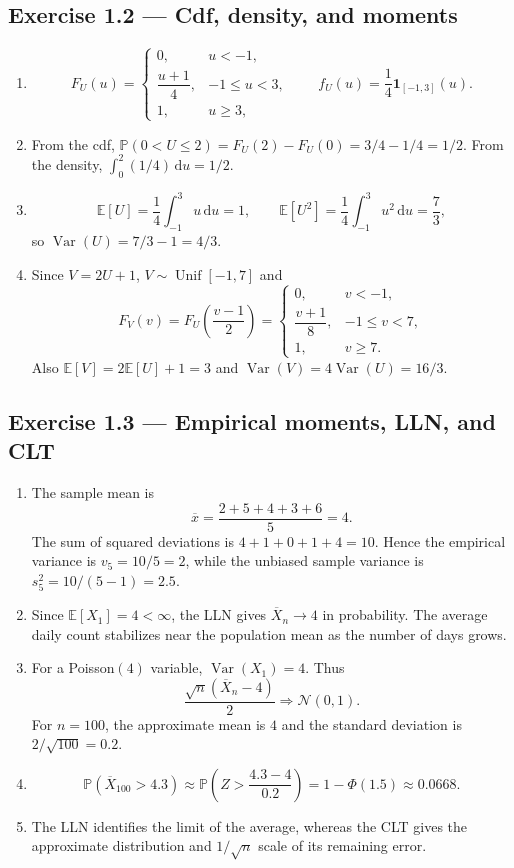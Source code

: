 \documentclass[11pt]{article}
\newcommand{\Pb}{\mathbb{P}}
\newcommand{\E}{\mathbb{E}}
\newcommand{\1}{\mathbf{1}}
\newcommand{\dd}{\,\mathrm{d}}
\begin{document}
\subsection*{Exercise 1.2 --- Cdf, density, and moments}
\begin{enumerate}
  \item
  \[
  F_U(u)=
  \begin{cases}
  0,&u<-1,\\
  \dfrac{u+1}{4},&-1\le u<3,\\
  1,&u\ge3,
  \end{cases}
  \qquad
  f_U(u)=\frac14\1_{[-1,3]}(u).
  \]
  \item From the cdf,
  $\Pb(0<U\le2)=F_U(2)-F_U(0)=3/4-1/4=1/2$.
  From the density, $\int_0^2(1/4)\dd u=1/2$.
  \item
  \[
  \E[U]=\frac14\int_{-1}^3u\dd u=1,
  \qquad
  \E[U^2]=\frac14\int_{-1}^3u^2\dd u=\frac73,
  \]
  so $\operatorname{Var}(U)=7/3-1=4/3$.
  \item Since $V=2U+1$, $V\sim\operatorname{Unif}[-1,7]$ and
  \[
  F_V(v)=F_U\!\left(\frac{v-1}{2}\right)
  =\begin{cases}
  0,&v<-1,\\
  \dfrac{v+1}{8},&-1\le v<7,\\
  1,&v\ge7.
  \end{cases}
  \]
  Also $\E[V]=2\E[U]+1=3$ and
  $\operatorname{Var}(V)=4\operatorname{Var}(U)=16/3$.
\end{enumerate}

\subsection*{Exercise 1.3 --- Empirical moments, LLN, and CLT}
\begin{enumerate}
  \item The sample mean is
  \[
  \overline x=\frac{2+5+4+3+6}{5}=4.
  \]
  The sum of squared deviations is $4+1+0+1+4=10$. Hence the empirical
  variance is $v_5=10/5=2$, while the unbiased sample variance is
  $s_5^2=10/(5-1)=2.5$.
  \item Since $\E[X_1]=4<\infty$, the LLN gives
  $\overline X_n\to4$ in probability. The average daily count stabilizes near
  the population mean as the number of days grows.
  \item For a Poisson$(4)$ variable, $\operatorname{Var}(X_1)=4$. Thus
  \[
  \frac{\sqrt n(\overline X_n-4)}{2}
  \Rightarrow\mathcal N(0,1).
  \]
  For $n=100$, the approximate mean is $4$ and the standard deviation is
  $2/\sqrt{100}=0.2$.
  \item
  \[
  \Pb(\overline X_{100}>4.3)
  \approx\Pb\!\left(Z>\frac{4.3-4}{0.2}\right)
  =1-\Phi(1.5)\approx0.0668.
  \]
  \item The LLN identifies the limit of the average, whereas the CLT gives the
  approximate distribution and $1/\sqrt n$ scale of its remaining error.
\end{enumerate}
\end{document}
